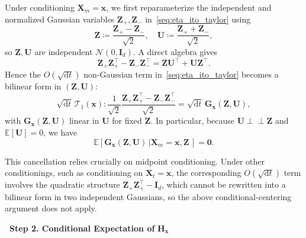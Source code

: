 \documentclass[
 longbibliography,
 twocolumn,
 superscriptaddress,
 amsmath,
 amssymb,
 amsthm,
 amsfonts,
 prl,
 floatfix,
]{revtex4-2}
\begin{document}
\begin{widetext}
Under conditioning $\bm X_m=\bm x$, we first reparameterize the independent and normalized Gaussian variables $\bm{Z}_+,\bm{Z}_-$ in~\eqref{seq:eta_ito_taylor} using
\begin{equation}
    \bm{Z}\coloneq\frac{\bm{Z}_+-\bm{Z}_-}{\sqrt{2}},
    \quad
    \bm{U}\coloneq\frac{\bm{Z}_++\bm{Z}_-}{\sqrt{2}},
    \label{seq:def_ZU}
\end{equation}
so $\bm{Z}, \bm{U}$ are independent $\mathcal{N}(0,\mathbf{I}_d)$. A direct algebra gives
\begin{equation*}
    \bm{Z}_+\bm{Z}_+^\intercal-\bm{Z}_-\bm{Z}_-^\intercal
    =\bm{Z}\bm{U}^\intercal+\bm{U}\bm{Z}^\intercal.
\end{equation*}
Hence the $O(\sqrt{\mathrm{d}t})$ non-Gaussian term in~\eqref{seq:eta_ito_taylor} becomes a bilinear form in $(\bm{Z},\bm{U})$:
\begin{equation*}
    \sqrt{\mathrm{d}t}\,\mathcal{T}_1(\bm{x}):
    \frac{1}{\sqrt 2}\frac{\bm{Z}_+\bm{Z}_+^\intercal-\bm{Z}_-\bm{Z}_-^\intercal}{\sqrt{2}}
    =\sqrt{\mathrm{d}t}\,\bm{G}_{\bm{x}}(\bm{Z},\bm{U}),
\end{equation*}
with $\bm{G}_{\bm{x}}(\bm{Z},\bm{U})$ linear in $\bm{U}$ for fixed $\bm{Z}$. In particular, because $\bm{U}\perp\!\!\!\perp\bm{Z}$ and $\mathbb{E}[\bm{U}]=0$, we have
\begin{equation}
    \mathbb{E}[\bm{G}_{\bm{x}}(\bm{Z},\bm{U})\,|\bm{X}_m=\bm{x},\bm{Z}\,]
    =\bm 0.
    \label{seq:G_cond_mean_zero}
\end{equation}

This cancellation relies crucially on midpoint conditioning. Under other conditionings, such as conditioning on $\bm{X}_t=\bm{x}$, the corresponding $O(\sqrt{\mathrm{d}t})$ term involves the quadratic structure $\bm{Z}_+\bm{Z}_+^\intercal-\mathbf{I}_d$, which cannot be rewritten into a bilinear form in two independent Gaussians, so the above conditional-centering argument does not apply.

\bigskip
\noindent\textbf{\textbullet\ Step 2. Conditional Expectation of} $\bm{H}_{\bm{x}}$


\end{widetext}
\end{document}
